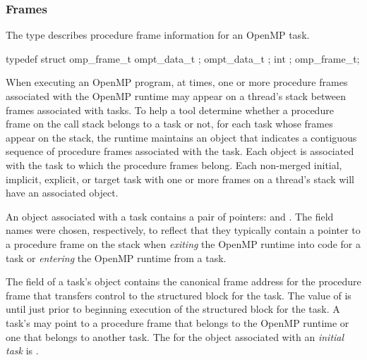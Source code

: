 \subsubsection{Frames}
\label{sec:omp_frame_t}
\summary
The  type describes procedure frame information for an OpenMP task.

\syntax
\begin{ccppspecific}
\begin{ompSyntax}
typedef struct omp_frame_t {
  ompt_data_t ;
  ompt_data_t ;
  int ;
} omp_frame_t;
\end{ompSyntax}
\end{ccppspecific}

\descr

When executing an OpenMP program, at times, one or more procedure frames associated with
the OpenMP runtime may appear on a thread's stack between frames
associated with tasks. To help a tool determine whether a procedure
frame on the call stack belongs to a task or not,
for each task whose frames appear on the stack, the runtime
maintains an  object
that indicates a contiguous sequence of
procedure frames associated with the task.
Each  object is associated with the task to which the procedure frames belong.
Each non-merged initial, implicit, explicit, or target task with one or more frames on a thread's stack
will have an associated  object.



An  object associated with a task contains a pair
of pointers:  and . The field names were
chosen, respectively, to reflect that they typically contain a pointer to a procedure frame on the stack when
\emph{exiting} the OpenMP runtime into code for a task or \emph{entering} the OpenMP runtime from a task.

The  field of a task's  object
contains the canonical frame address for the procedure frame that
transfers control to the structured block for the task.
The value of  is  until just prior to
beginning execution of the structured block for the task.
A task's  may point to a procedure frame that belongs
to the OpenMP runtime or one that belongs to another task.
The  for the  object associated
with an \emph{initial task} is .

